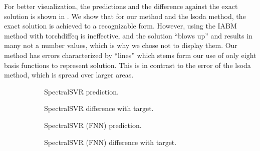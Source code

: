 \documentclass[preprint,12pt,times,authoryear]{elsarticle}
\begin{document}
For better visualization, the predictions and the difference against the exact solution is shown in . We show that for our method and the lsoda method, the exact solution is achieved to a recognizable form. However, using the IABM method with torchdiffeq is ineffective, and the solution \enquote{blows up} and results in many not a number values, which is why we chose not to display them. Our method has errors characterized by \enquote{lines} which stems form our use of only eight basis functions to represent solution. This is in contrast to the error of the lsoda method, which is spread over larger areas.
\begin{figure}[H]
  \centering
  \begin{adjustwidth}{-0.05\linewidth}{-0.05\linewidth}
    \begin{subfigure}{0.49\linewidth}
      \begin{adjustbox}{width=\linewidth}
        
      \end{adjustbox}
      \caption{SpectralSVR prediction.}\label{fig:comp_exact_lssvr_pred_0.1}
    \end{subfigure}
    \begin{subfigure}{0.49\linewidth}
      \begin{adjustbox}{width=\linewidth}
        
      \end{adjustbox}
      \caption{SpectralSVR difference with target.}\label{fig:comp_exact_lssvr_diff_0.1}
    \end{subfigure}
    \begin{subfigure}{0.49\linewidth}
      \begin{adjustbox}{width=\linewidth}
        
      \end{adjustbox}
      \caption{SpectralSVR (FNN) prediction.}\label{fig:comp_exact_fnn_pred_0.1}
    \end{subfigure}
    \begin{subfigure}{0.49\linewidth}
      \begin{adjustbox}{width=\linewidth}
        
      \end{adjustbox}
      \caption{SpectralSVR (FNN) difference with target.}\label{fig:comp_exact_fnn_diff_0.1}
    \end{subfigure}
    \begin{subfigure}{0.49\linewidth}

\end{subfigure}
\end{adjustwidth}
\end{figure}
\end{document}
